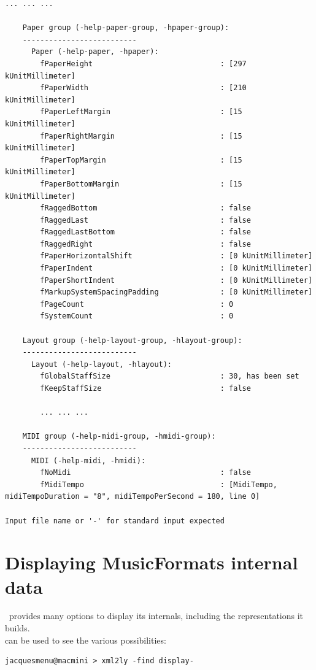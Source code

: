 \begin{lstlisting}[language=Terminal]
		... ... ...

    Paper group (-help-paper-group, -hpaper-group):
    --------------------------
      Paper (-help-paper, -hpaper):
        fPaperHeight                             : [297 kUnitMillimeter]
        fPaperWidth                              : [210 kUnitMillimeter]
        fPaperLeftMargin                         : [15 kUnitMillimeter]
        fPaperRightMargin                        : [15 kUnitMillimeter]
        fPaperTopMargin                          : [15 kUnitMillimeter]
        fPaperBottomMargin                       : [15 kUnitMillimeter]
        fRaggedBottom                            : false
        fRaggedLast                              : false
        fRaggedLastBottom                        : false
        fRaggedRight                             : false
        fPaperHorizontalShift                    : [0 kUnitMillimeter]
        fPaperIndent                             : [0 kUnitMillimeter]
        fPaperShortIndent                        : [0 kUnitMillimeter]
        fMarkupSystemSpacingPadding              : [0 kUnitMillimeter]
        fPageCount                               : 0
        fSystemCount                             : 0

    Layout group (-help-layout-group, -hlayout-group):
    --------------------------
      Layout (-help-layout, -hlayout):
        fGlobalStaffSize                         : 30, has been set
        fKeepStaffSize                           : false

		... ... ...

    MIDI group (-help-midi-group, -hmidi-group):
    --------------------------
      MIDI (-help-midi, -hmidi):
        fNoMidi                                  : false
        fMidiTempo                               : [MidiTempo, midiTempoDuration = "8", midiTempoPerSecond = 180, line 0]

Input file name or '-' for standard input expected
\end{lstlisting}


\section{Displaying MusicFormats internal data}\label{Displaying MusicFormats internal data}

\mf\ provides many options to display its internals, including the representations it builds. \\
 can be used to see the various possibilities:
\begin{lstlisting}[language=Terminal]
jacquesmenu@macmini > xml2ly -find display-
\end{lstlisting}

